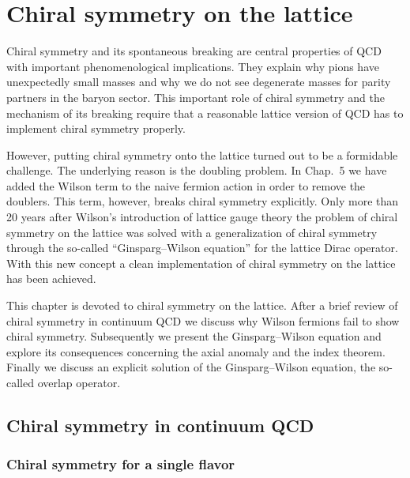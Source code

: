 
\chapter{Chiral symmetry on the lattice}

Chiral symmetry and its spontaneous breaking are central properties of QCD
with important phenomenological implications. They explain why pions have
unexpectedly small masses and why we do not see degenerate masses for parity
partners in the baryon sector. This important role of chiral symmetry and the
mechanism of its breaking require that a reasonable lattice version of QCD
has to implement chiral symmetry properly.

However, putting chiral symmetry onto the lattice turned out to be a
formidable challenge. The underlying reason is the doubling problem. In
Chap.~5 we have added the Wilson term to the naive fermion action in order to
remove the doublers. This term, however, breaks chiral symmetry explicitly.
Only more than 20 years after Wilson's introduction of lattice gauge theory
the problem of chiral symmetry on the lattice was solved with a generalization
of chiral symmetry through the so-called ``Ginsparg--Wilson equation'' for the
lattice Dirac operator. With this new concept a clean implementation of chiral
symmetry on the lattice has been achieved.

This chapter is devoted to chiral symmetry on the lattice. After a brief
review of chiral symmetry in continuum QCD we discuss why Wilson fermions
fail to show chiral symmetry. Subsequently we present the Ginsparg--Wilson
equation and explore its consequences concerning the axial anomaly and the
index theorem. Finally we discuss an explicit solution of the Ginsparg--Wilson
equation, the so-called overlap operator.

\section{Chiral symmetry in continuum QCD}

\subsection{Chiral symmetry for a single flavor}

